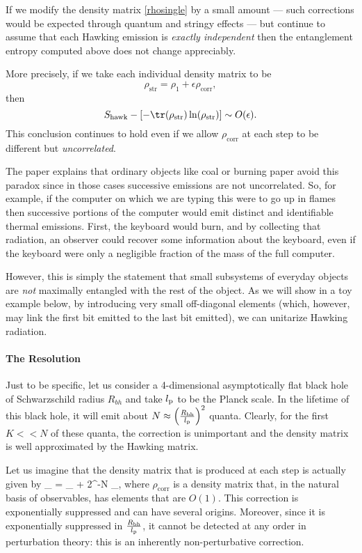 If we modify the density matrix \eqref{rhosingle} by a small amount --- such corrections would be expected through quantum and stringy effects --- but continue to assume that each Hawking emission is {\em exactly independent} then the entanglement entropy computed above does not change appreciably.

More precisely, if we take each individual density matrix to be
\[
\rho_{\text{str}} = \rho_1 + \epsilon \rho_{\text{corr}},
 \]
then
\[
S_{\text{hawk}} - \left[- \tr(\rho_{\text{str}}) \ln (\rho_{\text{str}})\right] \sim O(\epsilon).
 \]
This conclusion continues to hold even if we allow $\rho_{\text{corr}}$ at each step to be different but {\em uncorrelated}.

The paper \cite{Mathur:2012np} explains that ordinary objects like coal or burning paper avoid this paradox since in those cases successive emissions are not uncorrelated. So, for example, if the computer on which we are typing this were to go up in flames then successive portions of the computer would emit distinct and identifiable thermal emissions. First, the keyboard would burn, and by collecting that radiation, an observer could recover some information about the keyboard, even if the keyboard were only a negligible fraction of the mass of the full computer. 

However, this is simply the statement that small subsystems of everyday objects are {\em not} maximally entangled with the rest of the object. As we will show in a toy example below, by introducing very small off-diagonal elements (which, however, may link the first bit emitted to the last bit emitted), we can unitarize Hawking radiation. 

\paragraph{The Resolution\\}

Just to be specific, let us consider a 4-dimensional asymptotically flat black hole of Schwarzschild radius $R_{bh}$ and take $l_{\rm p}$ to be the Planck scale. In the lifetime of this black hole, it will emit about $N \approx \left({ R_{\text{bh}} \over l_{\text{p}}}\right)^2$ quanta.  Clearly, for the first $K << N$ of these quanta, the correction is unimportant and the density matrix is well approximated by the Hawking matrix. 

Let us imagine that the density matrix that is produced at each step is actually given by
\be
\label{unitarizingcorr}
\rho_{} = \rho_{} + 2^{-N} \rho_{},
\ee
where $\rho_{\text{corr}}$ is a density matrix that, in the natural basis of observables, has elements that are $O(1)$. This correction is exponentially suppressed and can have several origins. Moreover, since it is exponentially suppressed in ${R_{\text{bh}} \over l_{\text{p}}}$, it cannot be detected at any order in perturbation theory: this is an inherently non-perturbative correction. 

